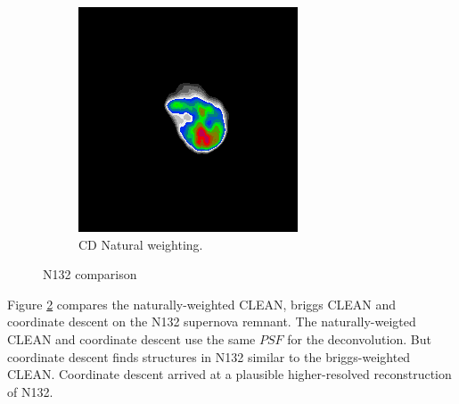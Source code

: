 \begin{figure}[h]
	\begin{subfigure}[b]{0.3\linewidth}
		\includegraphics[width=1.00\linewidth]{./chapters/10.results/cleancomp/n132_cd.png}
		\caption{CD Natural weighting.}
		\label{results:comp:N132:cd}
	\end{subfigure}
	\caption{N132 comparison}
	\label{results:cleancomp::N132:figure}
\end{figure}

Figure \ref{results:cleancomp::N132:figure} compares the naturally-weighted CLEAN, briggs CLEAN and coordinate descent on the N132 supernova remnant. The naturally-weigted CLEAN and coordinate descent use the same $PSF$ for the deconvolution. But coordinate descent finds structures in N132 similar to the briggs-weighted CLEAN. Coordinate descent arrived at a plausible higher-resolved reconstruction of N132.

